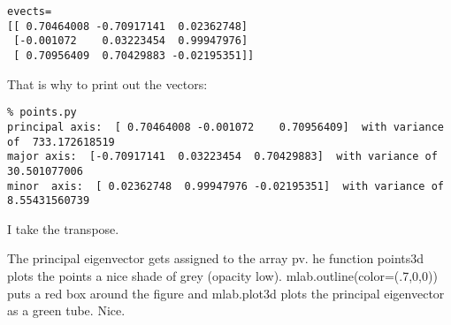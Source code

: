 {\singlespacing \color{blue}\begin{verbatim}
evects=
[[ 0.70464008 -0.70917141  0.02362748]
 [-0.001072    0.03223454  0.99947976]
 [ 0.70956409  0.70429883 -0.02195351]]
 \end{verbatim}}
 
 \noindent   That is why to print out the vectors:
 
 {\singlespacing \color{blue}\begin{verbatim}
% points.py
principal axis:  [ 0.70464008 -0.001072    0.70956409]  with variance of  733.172618519
major axis:  [-0.70917141  0.03223454  0.70429883]  with variance of  30.501077006
minor  axis:  [ 0.02362748  0.99947976 -0.02195351]  with variance of  8.55431560739
\end{verbatim}}


\noindent   I take the transpose. 

 The principal eigenvector gets assigned to the array {\color{blue}pv}.   he function {\color{blue}points3d} plots the points a nice shade of grey (opacity low). {\color{blue}mlab.outline(color=(.7,0,0))} puts a red box around the figure and {\color{blue}mlab.plot3d} plots the principal eigenvector as a green tube.  Nice.
 



\vfill

